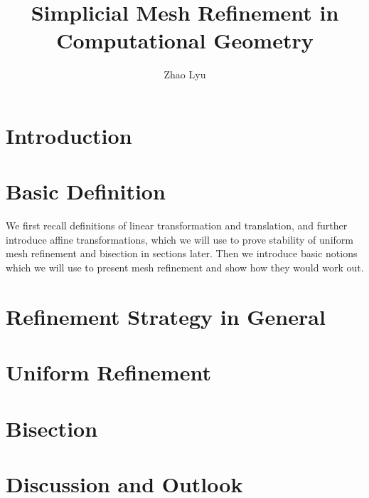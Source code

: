 \documentclass[english]{article}
\begin{document}
  \doublespacing %
  \title{\textbf{Simplicial Mesh Refinement in Computational Geometry}}
  \author{Zhao Lyu}
  \maketitle
  \singlespacing

  \newpage %
  \tableofcontents
  \newpage

  \section{Introduction}
  

  \section{Basic Definition}
    We first recall definitions of linear transformation and translation, and further introduce affine transformations, which we will use to prove stability of uniform mesh refinement and bisection in sections later. Then we introduce basic notions which we will use to present mesh refinement and show how they would work out.

    
    
    
    


  \section{Refinement Strategy in General}
    

  \section{Uniform Refinement}
    

  \section{Bisection}
    

  \section{Discussion and Outlook}
    

  \newpage
  
  
    
\end{document}
